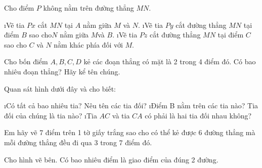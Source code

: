 \begin{bt}
	Cho điểm $P$ không nằm trên đường thẳng $MN$.
	\begin{enumerate}[a),leftmargin=*]
		\i Vẽ tia $Px$ cắt $MN$ tại $A$ nằm giữa $M$ và $N$.
		\i Vẽ tia $Py$ cắt đường thẳng $MN$ tại điểm $B$ sao cho$ N$ nằm giữa $M $và $B$.
		\i Vẽ tia $Pz$ cắt đường thẳng $MN$ tại điểm $C$ sao cho $C$ và $N$ nằm khác phía đối với $M$.
	\end{enumerate}
	\begin{loigiaichuong}
		
	\end{loigiaichuong}
\end{bt}
\begin{bt}
	Cho bốn điểm $A,B,C,D$ kẻ các đoạn thẳng có mặt là 2 trong 4 điểm đó. Có bao nhiêu đoạn thẳng? Hãy kể tên chúng.
	\begin{loigiaichuong}
		
	\end{loigiaichuong}
\end{bt}
\begin{bt}
	Quan sát hình dưới đây và cho biết:
	\begin{enumerate}[a),leftmargin=*]
		\i Có tất cả bao nhiêu tia? Nêu tên các tia đối?
		\i Điểm B nằm trên các tia nào? Tia đối của chúng là tia nào?
		\i Tia $AC$ và tia $CA$ có phải là hai tia đối nhau không?
	\end{enumerate}
	\begin{loigiaichuong}
		
	\end{loigiaichuong}
\end{bt}
\begin{bt}
	Em hãy vẽ 7 điểm trên 1 tờ giấy trắng sao cho có thể kẻ được 6 đường thẳng mà mỗi đường thẳng đều đi qua 3 trong 7 điểm đó. 
	\begin{loigiaichuong}
		
	\end{loigiaichuong}
\end{bt}
\begin{bt}
	Cho hình vẽ bên. Có bao nhiêu điểm là giao điểm của đúng 2 đường.
	\begin{loigiaichuong}
		
	\end{loigiaichuong}
\end{bt} 
